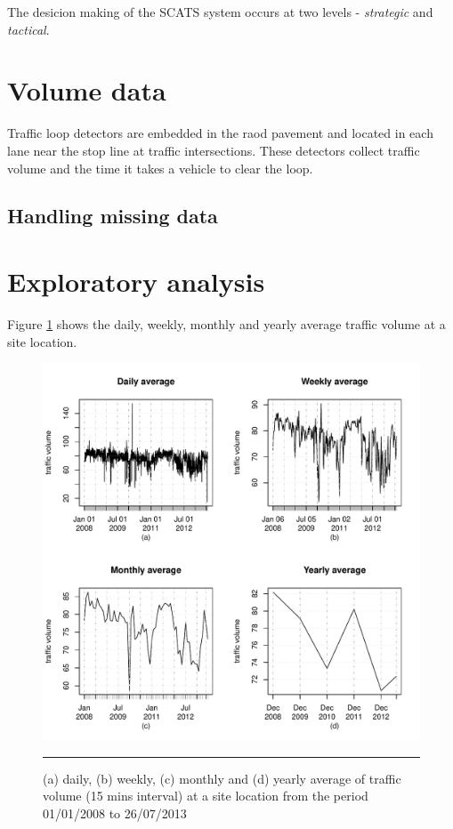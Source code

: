 The desicion making of the SCATS system occurs at two levels - \emph{strategic} and \emph{tactical}.


\section{Volume data}
Traffic loop detectors are embedded in the raod pavement and located in each lane near the stop
line at traffic intersections. These detectors collect traffic volume and the time it takes a
vehicle to clear the loop.


\subsection{Handling missing data}


\section{Exploratory analysis}
Figure \ref{fig:AverageTrafficVolume} shows the daily, weekly, monthly and yearly average traffic
volume at a site
location.

\begin{figure}[htbp]
  \centering
    \includegraphics[width=\textwidth,height=\textheight,keepaspectratio]{Figures/averages.pdf}
    \rule{35em}{0.5pt}
  \caption[Average Traffic Volume]{(a) daily, (b) weekly, (c) monthly and (d) yearly average of
  traffic volume (15 mins interval) at a site location from the period 01/01/2008 to 26/07/2013}
  \label{fig:AverageTrafficVolume}
\end{figure}
